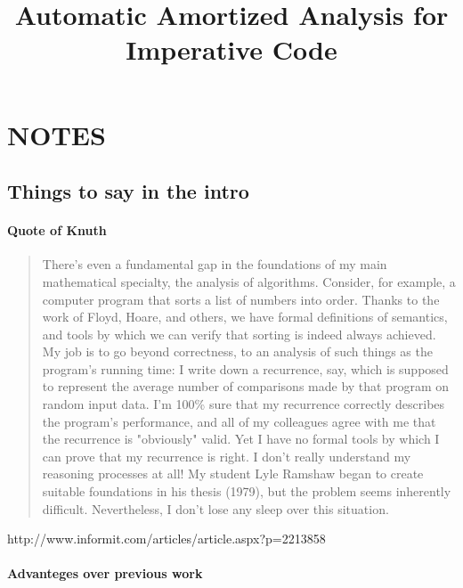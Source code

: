 \documentclass[10pt]{article}
\title{Automatic Amortized Analysis for Imperative Code}
\date{}
\author{}
\begin{document}
\maketitle

\section{NOTES}

\subsection{Things to say in the intro}

\paragraph{Quote of Knuth}

\begin{quotation}
  There's even a fundamental gap in the foundations of my main
  mathematical specialty, the analysis of algorithms. Consider, for
  example, a computer program that sorts a list of numbers into
  order. Thanks to the work of Floyd, Hoare, and others, we have
  formal definitions of semantics, and tools by which we can verify
  that sorting is indeed always achieved. My job is to go beyond
  correctness, to an analysis of such things as the program's running
  time: I write down a recurrence, say, which is supposed to represent
  the average number of comparisons made by that program on random
  input data. I'm 100\% sure that my recurrence correctly describes
  the program's performance, and all of my colleagues agree with me
  that the recurrence is "obviously" valid. Yet I have no formal tools
  by which I can prove that my recurrence is right. I don't really
  understand my reasoning processes at all! My student Lyle Ramshaw
  began to create suitable foundations in his thesis (1979), but the
  problem seems inherently difficult. Nevertheless, I don't lose any
  sleep over this situation.
\end{quotation}
http://www.informit.com/articles/article.aspx?p=2213858

\paragraph{Advanteges over previous work}
\end{document}

